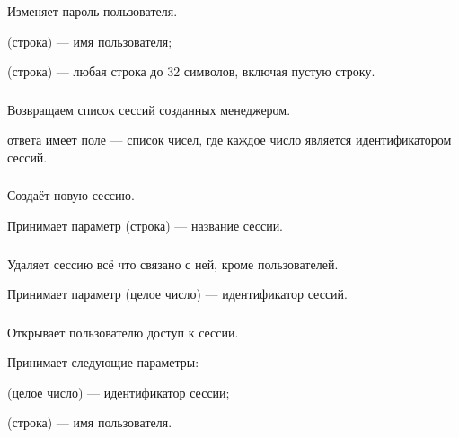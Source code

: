 Изменяет пароль пользователя.

\begin{icItems}
	\item {} (строка) — имя пользователя;
	\item {} (строка) — любая строка до 32 символов, включая пустую строку.
\end{icItems}

\subsubsection{}

Возвращаем список сессий созданных менеджером.

 ответа имеет поле  — список чисел, где каждое число является идентификатором сессий.

\subsubsection{}

Создаёт новую сессию.

Принимает параметр  (строка) — название сессии.

\subsubsection{}

Удаляет сессию всё что связано с ней, кроме пользователей.

Принимает параметр  (целое число) — идентификатор сессий.

\subsubsection{}

Открывает пользователю доступ к сессии.

Принимает следующие параметры:

\begin{icItems}
	\item {} (целое число) — идентификатор сессии;
	\item {} (строка) — имя пользователя.
\end{icItems}

\subsubsection{}

